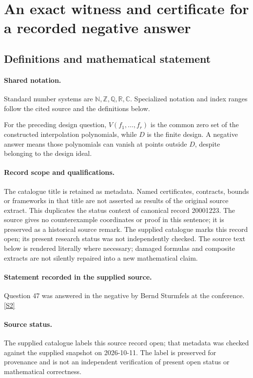 \documentclass[11pt]{article}
\newcommand{\sref}[2]{\hyperlink{source:#1:#2}{[S#2]}}
\begin{document}
\section{An exact witness and certificate for a recorded negative answer}\label{statement}

\subsection{Definitions and mathematical statement}

\paragraph{Shared notation.}Standard number systems are $\mathbb N,\mathbb Z,\mathbb Q,\mathbb R,\mathbb C$. Specialized notation and index ranges follow the cited source and the definitions below.


For the preceding design question, $V(f_1,\ldots,f_r)$ is the common zero set of the constructed interpolation polynomials, while $D$ is the finite design. A negative answer means those polynomials can vanish at points outside $D$, despite belonging to the design ideal.
\paragraph{Record scope and qualifications.}
The catalogue title is retained as metadata. Named certificates, contracts, bounds or frameworks in that title are not asserted as results of the original source extract.
This duplicates the status context of canonical record 20001223. The source gives no counterexample coordinates or proof in this sentence; it is preserved as a historical source remark. The supplied catalogue marks this record open; its present research status was not independently checked.
The source text below is rendered literally where necessary; damaged formulas and composite extracts are not silently repaired into a new mathematical claim.
\paragraph{Statement recorded in the supplied source.}
Question 47 was answered in the negative by Bernd Sturmfels at the conference. \sref{statement}{2}
\paragraph{Source status.}
The supplied catalogue labels this source record open; that metadata was checked against the supplied snapshot on 2026-10-11. The label is preserved for provenance and is not an independent verification of present open status or mathematical correctness.
\end{document}
